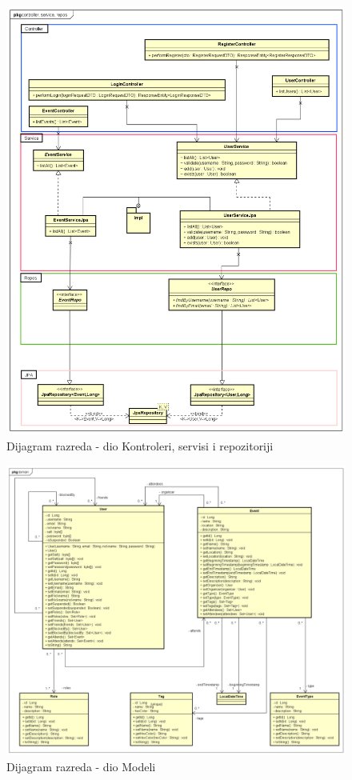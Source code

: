 		    \begin{figure}[h]
		    	\includegraphics[width=\textwidth]{dijagrami/UML kontroleri, servisi, repozitoriji.png}
		    	\caption{Dijagram razreda - dio Kontroleri, servisi i repozitoriji}
		    \end{figure}
			
			\begin{figure}[h]
				\includegraphics[width=\textwidth]{dijagrami/UML modeli.png}
				\caption{Dijagram razreda - dio Modeli}
			\end{figure}
		
